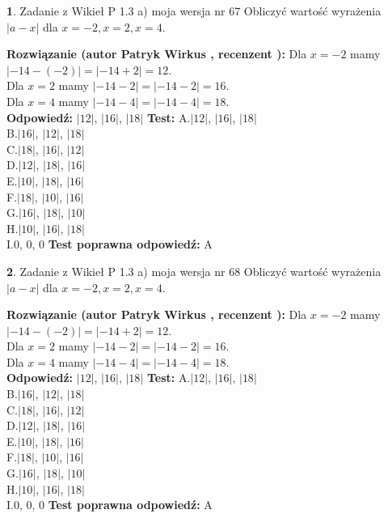 \documentclass[12pt, a4paper]{article}
\theoremstyle{definition} %
\newtheorem{zad}{}
\newcommand{\zadStart}[1]{\begin{zad}#1\newline}
\newcommand{\zadStop}{\end{zad}}
\newcommand{\rozwStart}[2]{\noindent \textbf{Rozwiązanie (autor #1 , recenzent #2): }\newline}
\newcommand{\rozwStop}{\newline}
\newcommand{\odpStart}{\noindent \textbf{Odpowiedź:}\newline}
\newcommand{\odpStop}{\newline}
\newcommand{\testStart}{\noindent \textbf{Test:}\newline}
\newcommand{\testStop}{\newline}
\newcommand{\kluczStart}{\noindent \textbf{Test poprawna odpowiedź:}\newline}
\newcommand{\kluczStop}{\newline}
\begin{document}
\zadStart{Zadanie z Wikieł P 1.3 a) moja wersja nr 67}
Obliczyć wartość wyrażenia $|a - x|$ dla $x=-2,x=2,x=4$.
\zadStop
\rozwStart{Patryk Wirkus}{}
Dla $x = -2$ mamy $|-14 - (-2)| = |-14 + 2| = 12$.\\
Dla $x = 2$ mamy $|-14 - 2| = |-14 - 2| = 16$.\\
Dla $x = 4$ mamy $|-14 - 4| = |-14 - 4| = 18$.\\
\rozwStop
\odpStart
$|12|$, $|16|$, $|18|$
\odpStop
\testStart
A.$|12|$, $|16|$, $|18|$\\
B.$|16|$, $|12|$, $|18|$\\
C.$|18|$, $|16|$, $|12|$\\
D.$|12|$, $|18|$, $|16|$\\
E.$|10|$, $|18|$, $|16|$\\
F.$|18|$, $|10|$, $|16|$\\
G.$|16|$, $|18|$, $|10|$\\
H.$|10|$, $|16|$, $|18|$\\
I.$0$, $0$, $0$
\testStop
\kluczStart
A
\kluczStop



\zadStart{Zadanie z Wikieł P 1.3 a) moja wersja nr 68}
Obliczyć wartość wyrażenia $|a - x|$ dla $x=-2,x=2,x=4$.
\zadStop
\rozwStart{Patryk Wirkus}{}
Dla $x = -2$ mamy $|-14 - (-2)| = |-14 + 2| = 12$.\\
Dla $x = 2$ mamy $|-14 - 2| = |-14 - 2| = 16$.\\
Dla $x = 4$ mamy $|-14 - 4| = |-14 - 4| = 18$.\\
\rozwStop
\odpStart
$|12|$, $|16|$, $|18|$
\odpStop
\testStart
A.$|12|$, $|16|$, $|18|$\\
B.$|16|$, $|12|$, $|18|$\\
C.$|18|$, $|16|$, $|12|$\\
D.$|12|$, $|18|$, $|16|$\\
E.$|10|$, $|18|$, $|16|$\\
F.$|18|$, $|10|$, $|16|$\\
G.$|16|$, $|18|$, $|10|$\\
H.$|10|$, $|16|$, $|18|$\\
I.$0$, $0$, $0$
\testStop
\kluczStart
A
\kluczStop
\end{document}
